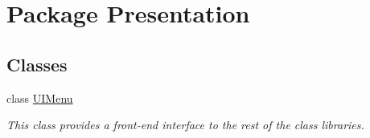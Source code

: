 \hypertarget{namespace_presentation}{\section{Package Presentation}
\label{namespace_presentation}
}
\subsection*{Classes}
\begin{DoxyCompactItemize}
\item 
class \hyperlink{class_presentation_1_1_u_i_menu}{U\-I\-Menu}
\begin{DoxyCompactList}\small\item\em This class provides a front-\/end interface to the rest of the class libraries. \end{DoxyCompactList}\end{DoxyCompactItemize}
